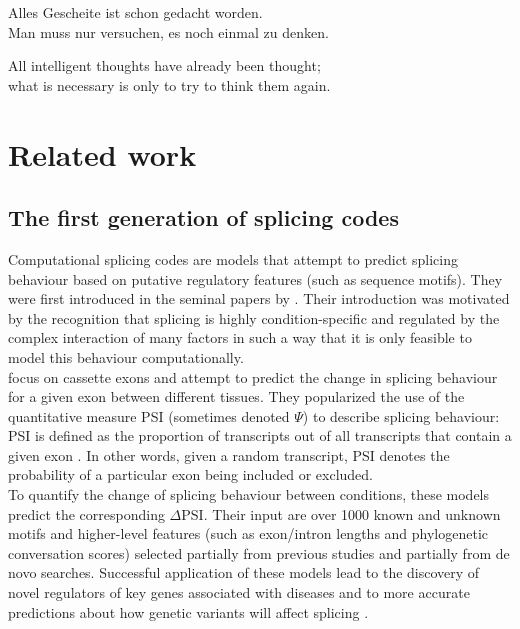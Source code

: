 \begin{savequote}[8cm]
	Alles Gescheite ist schon gedacht worden.\\
	Man muss nur versuchen, es noch einmal zu denken.
	
	All intelligent thoughts have already been thought;\\
	what is necessary is only to try to think them again.
\end{savequote}
\chapter{\label{ch:3-relatedwork}Related work} %
\section{The first generation of splicing codes}
Computational splicing codes are models that attempt to predict splicing behaviour based on putative regulatory features (such as sequence motifs).
They were first introduced in the seminal papers by \cite{barash2010a}\cite{barash2010b}. Their introduction was motivated by the recognition that splicing is highly condition-specific and regulated by the complex interaction of many factors in such a way that it is only feasible to model this behaviour computationally.\\
\cite{barash2010a} focus on cassette exons and attempt to predict the change in splicing behaviour for a given exon between different tissues. They popularized the use of the quantitative measure PSI (sometimes denoted $\Psi$) to describe splicing behaviour:
PSI is defined as the proportion of transcripts out of all transcripts that contain a given exon \cite{psi}. In other words, given a random transcript, PSI denotes the probability of a particular exon being included or excluded.\\
To quantify the change of splicing behaviour between conditions, these models predict the corresponding $\Delta$PSI. Their input are over 1000 known and unknown motifs and higher-level features (such as exon/intron lengths and phylogenetic conversation scores) selected partially from previous studies and partially from de novo searches. Successful application of these models lead to the discovery of novel regulators of key genes associated with diseases and to more accurate predictions about how genetic variants will affect splicing \cite{splicingcodegood1} \cite{splicingcodegood2}. 

